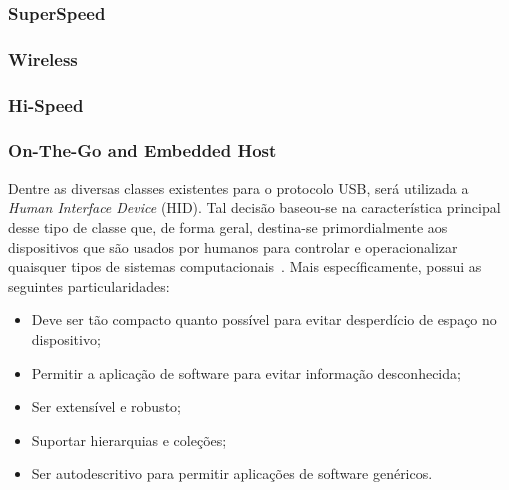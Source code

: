 \subsubsection{SuperSpeed}
\subsubsection{Wireless}
\subsubsection{Hi-Speed}
\subsubsection{On-The-Go and Embedded Host}

Dentre as diversas classes existentes para o protocolo USB, será utilizada a \emph{Human Interface Device} (HID). Tal decisão baseou-se na característica principal desse tipo de classe que, de forma geral, destina-se primordialmente aos dispositivos que são usados por humanos para controlar e operacionalizar quaisquer tipos de sistemas computacionais~\cite{hid}. Mais específicamente, possui as seguintes particularidades:

\begin{itemize}
	\item Deve ser tão compacto quanto possível para evitar desperdício de espaço no dispositivo;
	\item Permitir a aplicação de software para evitar informação desconhecida;
	\item Ser extensível e robusto;
	\item Suportar hierarquias e coleções;
	\item Ser autodescritivo para permitir aplicações de software genéricos.
\end{itemize}

